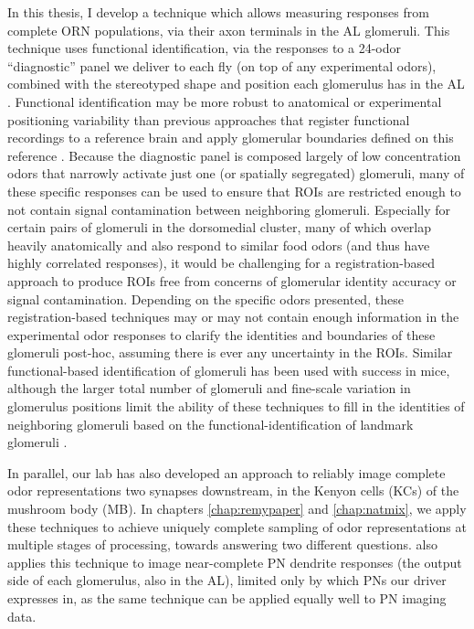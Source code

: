 \documentclass[12pt]{caltech_thesis}
\renewcommand{\cite}{{ }\autocite}
\begin{document}
\begin{refsection}
In this thesis, I develop a technique which allows measuring responses from complete ORN populations, via their axon terminals in the AL glomeruli.
This technique uses functional identification, via the responses to a 24-odor ``diagnostic'' panel we deliver to each fly (on top of any experimental odors), combined with the stereotyped shape and position each glomerulus has in the AL\cite{ALAtlas}.
Functional identification may be more robust to anatomical or experimental positioning variability than previous approaches that register functional recordings to a reference brain and apply glomerular boundaries defined on this reference\cite{Soucy2009,Badel2016,Endo2020}.
Because the diagnostic panel is composed largely of low concentration odors that narrowly activate just one (or spatially segregated) glomeruli, many of these specific responses can be used to ensure that ROIs are restricted enough to not contain signal contamination between neighboring glomeruli.
Especially for certain pairs of glomeruli in the dorsomedial cluster, many of which overlap heavily anatomically and also respond to similar food odors (and thus have highly correlated responses), it would be challenging for a registration-based approach to produce ROIs free from concerns of glomerular identity accuracy or signal contamination.
Depending on the specific odors presented, these registration-based techniques may or may not contain enough information in the experimental odor responses to clarify the identities and boundaries of these glomeruli post-hoc, assuming there is ever any uncertainty in the ROIs.
Similar functional-based identification of glomeruli has been used with success in mice, although the larger total number of glomeruli and fine-scale variation in glomerulus positions limit the ability of these techniques to fill in the identities of neighboring glomeruli based on the functional-identification of landmark glomeruli\cite{Soucy2009,Burton2022}.

In parallel, our lab has also developed an approach to reliably image complete odor representations two synapses downstream, in the Kenyon cells (KCs) of the mushroom body (MB).
In chapters \ref{chap:remypaper} and \ref{chap:natmix}, we apply these techniques to achieve uniquely complete sampling of odor representations at multiple stages of processing, towards answering two different questions.
 also applies this technique to image near-complete PN dendrite responses (the output side of each glomerulus, also in the AL), limited only by which PNs our driver expresses in, as the same technique can be applied equally well to PN imaging data.


\end{refsection}
\end{document}
